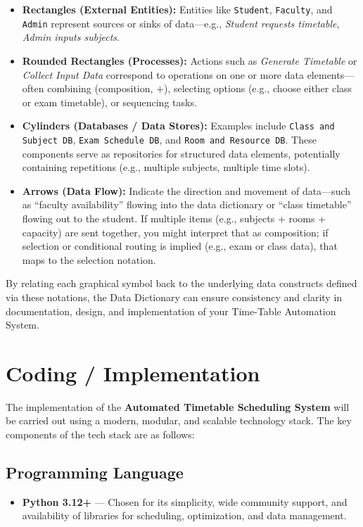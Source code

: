 \documentclass[12pt]{article}
\begin{document}
\begin{itemize}[label=\textbullet]
    \item \textbf{Rectangles (External Entities):} Entities like \texttt{Student}, \texttt{Faculty}, and \texttt{Admin} represent sources or sinks of data—e.g., \emph{Student requests timetable}, \emph{Admin inputs subjects}.
    \item \textbf{Rounded Rectangles (Processes):} Actions such as \emph{Generate Timetable} or \emph{Collect Input Data} correspond to operations on one or more data elements—often combining (composition, \(+\)), selecting options (e.g., choose either class or exam timetable), or sequencing tasks.
    \item \textbf{Cylinders (Databases / Data Stores):} Examples include \texttt{Class and Subject DB}, \texttt{Exam Schedule DB}, and \texttt{Room and Resource DB}. These components serve as repositories for structured data elements, potentially containing repetitions (e.g., multiple subjects, multiple time slots).
    \item \textbf{Arrows (Data Flow):} Indicate the direction and movement of data—such as ``faculty availability'' flowing into the data dictionary or ``class timetable'' flowing out to the student. If multiple items (e.g., subjects + rooms + capacity) are sent together, you might interpret that as composition; if selection or conditional routing is implied (e.g., exam or class data), that maps to the selection notation.
\end{itemize}

By relating each graphical symbol back to the underlying data constructs defined via these notations, the Data Dictionary can ensure consistency and clarity in documentation, design, and implementation of your Time-Table Automation System.

\newpage
\section{Coding / Implementation}

The implementation of the \textbf{Automated Timetable Scheduling System} will
be carried out using a modern, modular, and scalable technology stack. The key
components of the tech stack are as follows:

\subsection{Programming Language}
\begin{itemize}
    \item \textbf{Python 3.12+} --- Chosen for its simplicity, wide community support,
    and availability of libraries for scheduling, optimization, and data management.
\end{itemize}
\end{document}
